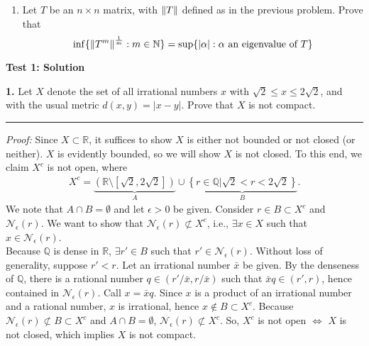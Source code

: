 \documentclass[11pt]{article}
\begin{document}
\begin{enumerate}
\begin{enumerate}
\end{enumerate}

\item  Let $T$ be an $n \times n$ matrix,  with $\norm{T}$ defined as in the previous problem.   Prove that
$$ \inf \{  \norm{T^m} ^\frac{1}{m} : m \in \mathbb{N} \} = \sup \{ |\alpha| : \alpha \mbox{ an eigenvalue of } T \} $$

\end{enumerate}


\newpage

\begin{center}
	{\Large\bf  Test 1:  Solution}
\end{center}


\noindent \textbf{1.} Let $X$ denote the set of all irrational numbers $x$ with $ \sqrt{2} \leq x \leq 2 \sqrt{2}$,   and with the usual metric $d(x,y) = | x - y |$.  Prove that $X$ is not compact.\\

\hrule
$\,$\\
\noindent \textit{Proof:} Since $X \subset \mathbb{R}$, it suffices to show $X$ is either not bounded or not closed (or neither). $X$ is evidently bounded, so we will show $X$ is not closed. To this end, we claim $X^c$ is not open, where
\begin{align*}
X^c = \underbrace{\left(\mathbb{R}\setminus [\sqrt{2}, 2\sqrt{2}]\right)}_{A}\cup \underbrace{\left\{ r\in \mathbb{Q} \vert \sqrt{2} < r < 2\sqrt{2} \right\}}_{B}.
\end{align*}
We note that $A \cap B = \emptyset$ and let $\epsilon > 0$ be given. Consider $r\in B \subset X^c$ and $\mathcal{N}_\epsilon(r)$. We want to show that $\mathcal{N}_\epsilon(r) \not\subset X^c$, i.e., $\exists x \in X$ such that $x \in \mathcal{N}_\epsilon(r)$.\\


Because $\mathbb{Q}$ is dense in $\mathbb{R}$, $\exists r' \in B$ such that $ r'\in \mathcal{N}_\epsilon(r)$. Without loss of generality, suppose $r' < r$. Let an irrational number $\bar{x}$ be given. By the denseness of $\mathbb{Q}$, there is a rational number $q\in (r'/\bar{x},r/\bar{x})$ such that $\bar{x}q \in (r',r)$, hence contained in $\mathcal{N}_\epsilon(r)$. Call $x = \bar{x}q$. Since $x$ is a product of an irrational number and a rational number, $x$ is irrational, hence $x\notin B \subset X^c$. Because $\mathcal{N}_\epsilon(r) \not\subset B \subset X^c$ and $A \cap B = \emptyset$, $\mathcal{N}_\epsilon(r) \not\subset X^c$. So, $X^c$ is not open $\iff$ $X$ is not closed, which implies $X$ is not compact. \\
\end{document}
